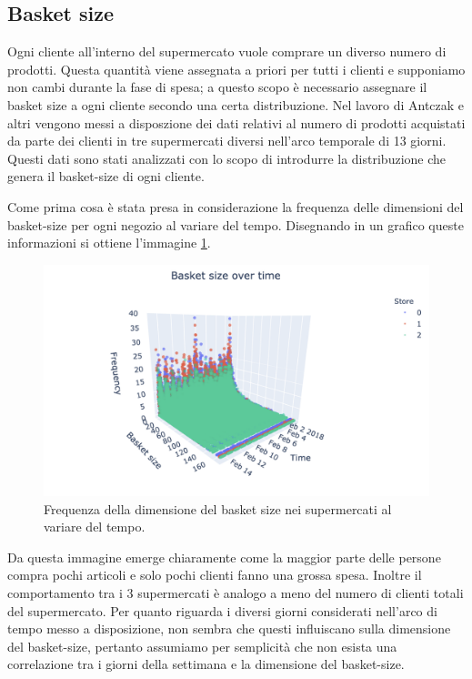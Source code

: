 \subsection{Basket size}
Ogni cliente all'interno del supermercato vuole comprare un diverso numero di prodotti. Questa quantità viene assegnata a priori per tutti i clienti e supponiamo non cambi durante la fase di spesa; a questo scopo è necessario assegnare il basket size a ogni cliente secondo una certa distribuzione. Nel lavoro di Antczak e altri \cite{article1} vengono messi a disposzione dei dati relativi al numero di prodotti acquistati da parte dei clienti in tre supermercati diversi nell'arco temporale di 13 giorni. Questi dati sono stati analizzati con lo scopo di introdurre la distribuzione che genera il basket-size di ogni cliente.

Come prima cosa è stata presa in considerazione la frequenza delle dimensioni del basket-size per ogni negozio al variare del tempo. Disegnando in un grafico queste informazioni si ottiene l'immagine \ref{fig:3d_basket_size}.

\begin{figure}[H]
	\centering
	\includegraphics[width=14cm]{"images/3d_basket_size.png"}
	\caption{Frequenza della dimensione del basket size nei supermercati al variare del tempo.}
	\label{fig:3d_basket_size}
\end{figure}

Da questa immagine emerge chiaramente come la maggior parte delle persone compra pochi articoli e solo pochi clienti fanno una grossa spesa. Inoltre il comportamento tra i 3 supermercati è analogo a meno del numero di clienti totali del supermercato. Per quanto riguarda i diversi giorni considerati nell'arco di tempo messo a disposizione, non sembra che questi influiscano sulla dimensione del basket-size, pertanto assumiamo per semplicità che non esista una correlazione tra i giorni della settimana e la dimensione del basket-size.

